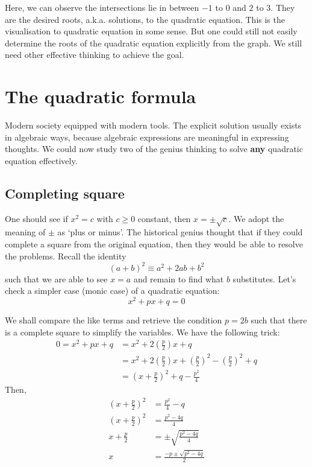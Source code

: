 \documentclass[12pt]{article}
\begin{document}
    Here, we can observe the intersections lie in between $-1$ to $0$ and $2$ to $3$. They are the desired roots, a.k.a. solutions, to the quadratic equation. This is the visualisation to quadratic equation in some sense. But one could still not easily determine the roots of the quadratic equation explicitly from the graph. We still need other effective thinking to achieve the goal.

    \section*{The quadratic formula}
    Modern society equipped with modern tools. The explicit solution usually exists in algebraic ways, because algebraic expressions are meaningful in expressing thoughts. We could now study two of the genius thinking to solve \textbf{any} quadratic equation effectively.

    \subsection*{Completing square}
    One should see if $x^2=c$ with $c\geq0$ constant, then $x=\pm\sqrt{c}$. We adopt the meaning of $\pm$ as `plus or minus'. The historical genius thought that if they could complete a square from the original equation, then they would be able to resolve the problems. Recall the identity $$(a+b)^2\equiv a^2+2ab+b^2$$ such that we are able to see $x=a$ and remain to find what $b$ substitutes. Let's check a simpler case (monic case) of a quadratic equation: $$x^2+px+q=0$$

    We shall compare the like terms and retrieve the condition $p=2b$ such that there is a complete square to simplify the variables. We have the following trick:
    \begin{align*}
        0=x^2+px+q&=x^2+2(\frac{p}{2})x+q\\
        &=x^2+2(\frac{p}{2})x+(\frac{p}{2})^2-(\frac{p}{2})^2+q\\
        &=(x+\frac{p}{2})^2+q-\frac{p^2}{4}
    \end{align*}
    Then,
    \begin{align*}
        (x+\frac{p}{2})^2&=\frac{p^2}{4}-q\\
        (x+\frac{p}{2})^2&=\frac{p^2-4q}{4}\\
        x+\frac{p}{2}&=\pm\sqrt{\frac{p^2-4q}{4}}\\
        x&=\frac{-p\pm\sqrt{p^2-4q}}{2}
    \end{align*}
\end{document}
